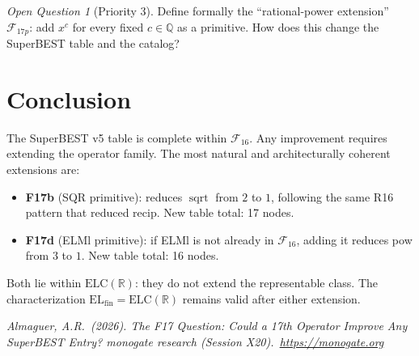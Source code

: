 \documentclass[12pt,a4paper]{article}
\theoremstyle{definition}
\theoremstyle{remark}
\newtheorem{openq}[theorem]{Open Question}
\newcommand{\sqrtop}{\operatorname{sqrt}}
\newcommand{\F}{\mathcal{F}_{16}}
\newcommand{\Q}{\mathbb{Q}}
\newcommand{\ELC}{\mathrm{ELC}(\mathbb{R})}
\newcommand{\ELfin}{\mathrm{EL}_{\mathrm{fin}}}
\begin{document}
\begin{openq}[Priority 3]
Define formally the ``rational-power extension'' $\mathcal{F}_{17p}$:
add $x^c$ for every fixed $c\in\Q$ as a primitive.
How does this change the SuperBEST table and the catalog?
\end{openq}

\section*{Conclusion}

The SuperBEST v5 table is complete within $\mathcal{F}_{16}$.
Any improvement requires extending the operator family.
The most natural and architecturally coherent extensions are:

\begin{itemize}
  \item \textbf{F17b} (SQR primitive): reduces $\sqrtop$ from $2$ to $1$,
    following the same R16 pattern that reduced recip.
    New table total: 17 nodes.
  \item \textbf{F17d} (ELMl primitive): if ELMl is not already in $\F$,
    adding it reduces pow from $3$ to $1$.
    New table total: 16 nodes.
\end{itemize}

Both lie within $\ELC$: they do not extend the representable class.
The characterization $\ELfin = \ELC$ remains valid after either extension.

\bigskip
\noindent\textit{Almaguer, A.R.\ (2026).
The F17 Question: Could a 17th Operator Improve Any SuperBEST Entry?
monogate research (Session X20).\ \url{https://monogate.org}}
\end{document}
